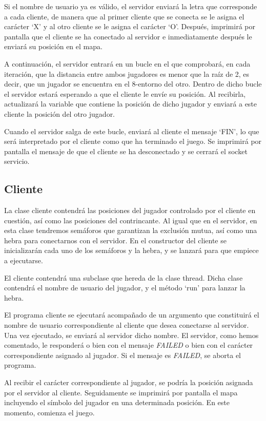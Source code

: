 Si el nombre de usuario ya es válido, el servidor enviará la letra que corresponde a cada cliente, de manera que al primer cliente que se conecta se le asigna el carácter ‘X’ y al otro cliente se le asigna el carácter ‘O’. Después, imprimirá por pantalla que el cliente se ha conectado al servidor e inmediatamente después le enviará su posición en el mapa. 

A continuación, el servidor entrará en un bucle en el que comprobará, en cada iteración, que la distancia entre ambos jugadores es menor que la raíz de 2, es decir, que un jugador se encuentra en el 8-entorno del otro. Dentro de dicho bucle el servidor estará esperando a que el cliente le envíe su posición. Al recibirla, actualizará la variable que contiene la posición de dicho jugador y enviará a este cliente la posición del otro jugador.

Cuando el servidor salga de este bucle, enviará al cliente el mensaje ‘FIN’, lo que será interpretado por el cliente como que ha terminado el juego. Se imprimirá por pantalla el mensaje de que el cliente se ha desconectado y se cerrará el socket servicio.


\subsection{Cliente}
La clase cliente contendrá las posiciones del jugador controlado por el cliente en cuestión, así como las posiciones del contrincante. Al igual que en el servidor, en esta clase tendremos semáforos que garantizan la exclusión mutua, así como una hebra para conectarnos con el servidor. En el constructor del cliente se inicializarán cada uno de los semáforos y la hebra, y se lanzará para que empiece a ejecutarse. 

El cliente contendrá una subclase que hereda de la clase thread. Dicha clase contendrá el nombre de usuario del jugador, y el método ‘run’ para lanzar la hebra.

El programa cliente se ejecutará acompañado de un argumento que constituirá el nombre de usuario correspondiente al cliente que desea conectarse al servidor. Una vez ejecutado, se enviará al servidor dicho nombre. El servidor, como hemos comentado, le responderá o bien con el mensaje \textit{FAILED}  o bien con el carácter correspondiente asignado al jugador. Si el mensaje es \textit{FAILED}, se aborta el programa.

Al recibir el carácter correspondiente al jugador, se podría la posición asignada por el servidor al cliente. Seguidamente se imprimirá por pantalla el mapa incluyendo el símbolo del jugador en una determinada posición. En este momento, comienza el juego.

